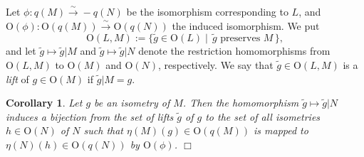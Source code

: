\documentclass{amsart}
\newtheorem{corollary}[theorem]{Corollary}
\numberwithin{equation}{section}
\numberwithin{table}{section}
\numberwithin{figure}{section}
\newcommand{\isom}{\xrightarrow{\sim}}
\newcommand{\set}[2]{\{ {#1}\mid {#2}  \}}
\newcommand{\OG}{\mathord{\mathrm{O}}}
\renewcommand{\qed}{\hfill {$\Box$}}
\begin{document}
Let $\phi\colon q(M) \isom -q(N) $ be the isomorphism  corresponding to $L$,
and $\OG(\phi)\colon \OG(q(M)) \isom \OG(q(N))$ the induced isomorphism.
We put
\[
\OG(L, M):=\set{\tilde{g}\in \OG(L)}{\,\textrm{$\tilde{g}$ preserves $M$}\,},
\]
and let $\tilde{g}\mapsto \tilde{g}|M$ and $\tilde{g}\mapsto \tilde{g}|N$
denote the restriction homomorphisms from $\OG(L, M)$ to $\OG(M)$ and $\OG(N)$, respectively.
We say that $\tilde{g}\in \OG(L, M)$ is a \emph{lift} of $g\in \OG(M)$
if $\tilde{g}|M=g$.
%
\begin{corollary}\label{cor:lifts}
Let $g$ be an isometry of $M$.
Then the  homomorphism
$\tilde{g}\mapsto \tilde{g}|N$ induces a bijection
from the set of lifts $\tilde{g}$ of $g$ to the set of all isometries $h\in \OG(N)$ of $N$
such that $\eta(M)(g)\in \OG(q(M))$ is mapped to $\eta(N)(h)\in \OG(q(N))$ by $\OG(\phi)$.
\qed
\end{corollary}
%
\end{document}
